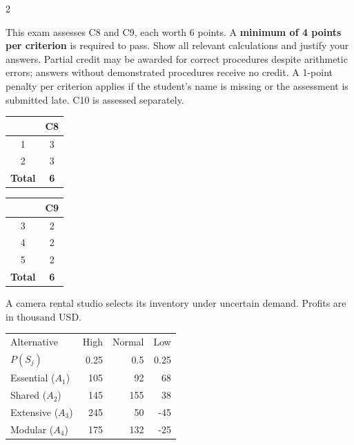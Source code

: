 	\begin{multicols}{2}
		\raggedcolumns
		
		This exam assesses C8 and C9, each worth 6 points. A \textbf{minimum of 4 points per criterion} is required to pass. Show all relevant calculations and justify your answers. Partial credit may be awarded for correct procedures despite arithmetic errors; answers without demonstrated procedures receive no credit. A 1-point penalty per criterion applies if the student's name is missing or the assessment is submitted late. C10 is assessed separately.
		
		\vspace{-7mm}
		\begin{center}
			\begin{tabular}{|c|c|}
				\hline
				\textbf{\textnumero} & \textbf{C8} \\ \hline
				1 & 3 \\ \hline
				2 & 3 \\ \hline
				\textbf{Total} & \textbf{6} \\ \hline
			\end{tabular}
			\hspace{1cm}
			\begin{tabular}{|c|c|}
				\hline
				\textbf{\textnumero} & \textbf{C9} \\ \hline
				3 & 2 \\ \hline
				4 & 2 \\ \hline
				5 & 2 \\ \hline
				\textbf{Total} & \textbf{6} \\ \hline
			\end{tabular}
		\end{center}
		\vspace{-4mm}
		
		
A camera rental studio selects its inventory under uncertain demand. Profits are in thousand USD.

\vspace{-3mm}
\begin{center}\small\setlength{\tabcolsep}{4pt}
	\begin{tabular}{lrrr}\toprule
		Alternative & High & Normal & Low\\
		$P(S_j)$ & 0.25 & 0.5 & 0.25\\ \midrule
				Essential ($A_1$) & 105 & 92 & 68\\
		Shared ($A_2$) & 145 & 155 & 38\\
		Extensive ($A_3$) & 245 & 50 & -45\\
		Modular ($A_4$) & 175 & 132 & -25\\
		\bottomrule
	\end{tabular}
\end{center} \vspace*{-3mm}


\end{multicols}
